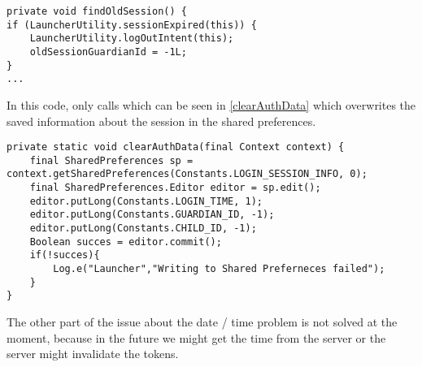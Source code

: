 \begin{minipage}[H]{\linewidth}
\begin{lstlisting}[caption = Our solution to not clearing the token, label =
FixNonDeletToken] 
private void findOldSession() {
if (LauncherUtility.sessionExpired(this)) {
	LauncherUtility.logOutIntent(this);
    oldSessionGuardianId = -1L;
}
...
\end{lstlisting} 
\end{minipage}

In this code,  only calls  which can be
seen in \autoref{clearAuthData} which overwrites the saved information about the
session in the shared preferences.\nl

\begin{minipage}[H]{\linewidth}
\begin{lstlisting}[caption = ClearAuthData methode, label = clearAuthData]
private static void clearAuthData(final Context context) {
    final SharedPreferences sp = context.getSharedPreferences(Constants.LOGIN_SESSION_INFO, 0);
    final SharedPreferences.Editor editor = sp.edit();
    editor.putLong(Constants.LOGIN_TIME, 1);
    editor.putLong(Constants.GUARDIAN_ID, -1);
    editor.putLong(Constants.CHILD_ID, -1);
    Boolean succes = editor.commit();
    if(!succes){
    	Log.e("Launcher","Writing to Shared Preferneces failed");
    }
}
\end{lstlisting} 
\end{minipage}

The other part of the issue about the date / time problem is not solved at the
moment, because in the future we might get the time from the server or the server
might invalidate the tokens.

